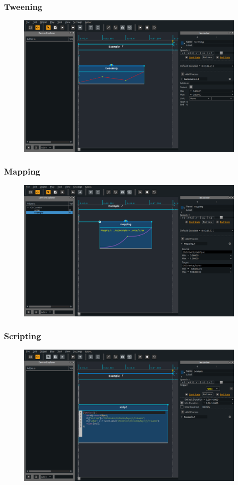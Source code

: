 \documentclass[handout]{beamer}
\begin{document}
\begin{frame}
\frametitle{Tweening}
\Large
\begin{figure}
    \includegraphics[width=\textwidth]{images/tween.png}
\end{figure}
\end{frame}

\begin{frame}
\frametitle{Mapping}
\Large
\begin{figure}
    \includegraphics[width=\textwidth]{images/mapping.png}
\end{figure}
\end{frame}

\begin{frame}
\frametitle{Scripting}
\Large
\begin{figure}
    \includegraphics[width=\textwidth]{images/script.png}
\end{figure}
\end{frame}
\end{document}
